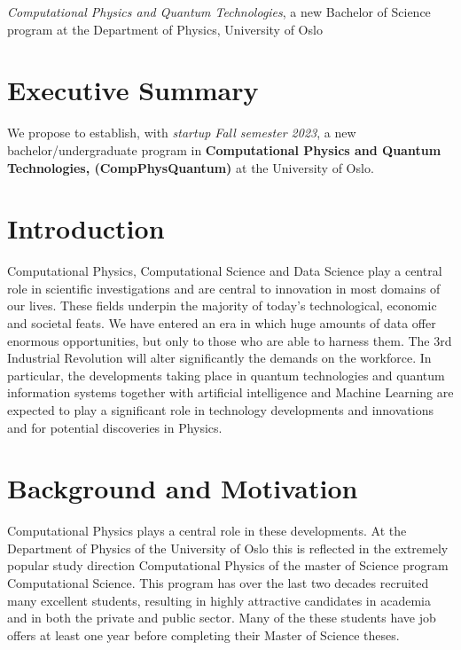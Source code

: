 \documentclass[oneside,final,10pt]{article}
\begin{document}
\thispagestyle{empty}

\begin{center}
{\LARGE\bf
\begin{spacing}{1.25}
{\em Computational Physics and Quantum Technologies}, a new Bachelor of Science program  at the Department of Physics, University of Oslo
\end{spacing}
}
\end{center}



\vspace{1cm}


\section*{Executive Summary}

We propose to establish, with {\em startup Fall semester 2023}, a new bachelor/undergraduate program in {\bf Computational Physics and Quantum Technologies, (CompPhysQuantum)}  at the University of Oslo. 

\section*{Introduction}

Computational Physics, Computational Science  and Data Science play a central role in scientific investigations and are central to innovation in most domains of our lives. These fields underpin the majority of today's technological, economic and societal feats. We have entered an era in which huge amounts of data offer enormous opportunities, but only to those who are able to harness them. The 3rd Industrial Revolution will alter significantly the demands on the workforce. In particular, the developments taking place in quantum technologies and quantum information systems together with artificial intelligence and Machine Learning are expected to play a significant role in technology developments and innovations and for potential discoveries in Physics.



\section{Background and Motivation}

Computational Physics plays a central role in these developments. At the Department of Physics of the University of Oslo this is reflected in the extremely popular study direction Computational Physics of the master of Science program Computational Science. This program has over the last two decades recruited many excellent students, resulting in highly attractive candidates in academia and in both the private and public sector. Many of the these students have job offers at least one year before completing their Master of Science theses.
\end{document}
